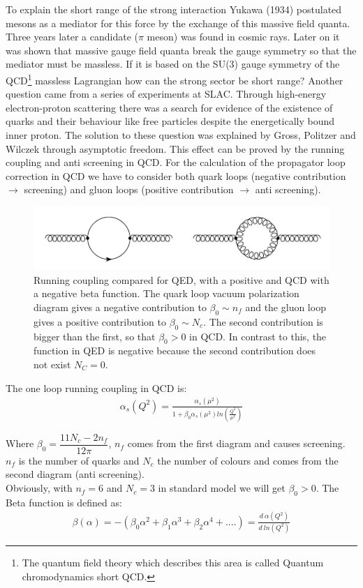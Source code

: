 To explain the short range of the strong interaction Yukawa (1934) postulated mesons as a mediator for this force by the exchange of this massive field quanta. Three years later a candidate ($ \pi $ meson) was found in cosmic rays. Later on it was shown that massive gauge field quanta break the gauge symmetry so that the mediator must be massless. If it is based on the SU(3) gauge symmetry of the QCD\footnote{The quantum field theory which describes this area is called Quantum chromodynamics short QCD.} massless Lagrangian how can the strong sector be short range? Another question came from a series of experiments at SLAC. Through high-energy electron-proton scattering there was a search for evidence of the existence of quarks and their behaviour like free particles despite the energetically bound inner proton. The solution to these question was explained by Gross, Politzer and Wilczek through asymptotic freedom. 
This effect can be proved by the running coupling and anti screening in QCD.
For the calculation of the propagator loop correction in QCD we have to consider both quark loops (negative contribution $ \rightarrow $ screening) and gluon loops (positive contribution $ \rightarrow $ anti screening). 
\begin{figure}[h!]
\centering
\includegraphics[scale=0.7]{images/Intro/quarkGluonPop.png}
\caption{Running coupling compared for QED, with a positive and QCD with a negative beta function. The quark loop vacuum polarization diagram gives a negative contribution
to $\beta_0 \sim n_f$ and the gluon loop gives a positive contribution to $\beta_0 \sim N_c$. The second contribution is bigger than the first, so that $ \beta_0 > 0 $ in QCD. In contrast to this, the function in QED is negative because the second contribution does not exist $ N_C=0 $.}
\end{figure}

The one loop running coupling in QCD is:
\begin{equation}
\begin{split}
\alpha_s(Q^2)= \frac{\alpha_s(\mu^2)}{1+\beta_0 \alpha_s(\mu^2) ln(\frac{Q^2}{\mu^2})}
\end{split}
\end{equation}

Where $ \beta_0 = \dfrac{11N_c -2n_f}{12\pi} $, $ n_f $ comes from the first diagram and causes screening.  $ n_f $ is the number of quarks and $ N_c $ the number of colours and comes from the second diagram (anti screening). \\
Obviously, with $ n_f = 6 $ and $ N_c = 3 $ in standard model we will get $ \beta_0 >0 $. The Beta function is defined as:
\begin{equation}
\begin{split}
\beta(\alpha)=-(\beta_0 \alpha^2 + \beta_1 \alpha^3+\beta_2\alpha^4+....)=\frac{d\:\alpha(Q^2)}{d \:ln(Q^2)}
\end{split}
\end{equation}

